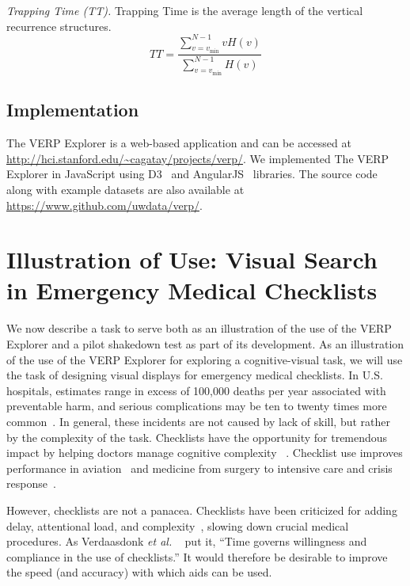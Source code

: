 \documentclass{sigchi}
\newcommand{\etal}{\textit{et al.}\xspace}
\begin{document}
\emph{Trapping Time (TT).} Trapping Time is the average length of the
vertical recurrence structures.
\[
	TT = 
	\frac{
		\sum_{v=v_{\min} }^{N-1}{vH(v)}
 	}{
		\sum_{v=v_{\min} }^{N-1}{ H(v)}
 	}
\]

\subsection{Implementation}  The VERP Explorer is a web-based application
and can be accessed at
\url{http://hci.stanford.edu/~cagatay/projects/verp/}. We implemented The
VERP Explorer in JavaScript using D3~\cite{d3_infovis11} and
AngularJS~\cite{angularweb} libraries.  The source code along with example
datasets are also available at \url{https://www.github.com/uwdata/verp/}. 



\section{Illustration of Use: Visual Search in Emergency Medical Checklists}

We now describe a task to serve both as an illustration of the use of the VERP Explorer and a pilot shakedown test as part of its development. As an illustration of the use of the VERP Explorer for exploring a
cognitive-visual task, we will use the task of designing visual displays
for emergency medical checklists. In U.S. hospitals, estimates range in
excess of 100,000 deaths per year associated with preventable harm, and
serious complications may be ten to twenty times more common~\cite{James_2013}. 
In general, these incidents are not caused by lack of skill, but rather by the
complexity of the task.  Checklists have the opportunity for tremendous
impact by helping doctors manage cognitive complexity ~\cite{Gawande_2009}. 
Checklist use improves performance in aviation~\cite{Boorman_2001,Degani_1990,Burian_2005} 
and medicine from  surgery to intensive care and crisis  
response~\cite{Arriaga_2013,Gawande_2009,Harrison_2006, 
Haynes_2009,Makary_2006,Pronovost_2006,Ziewacz_2011}.

However, checklists are not a panacea. Checklists have been criticized for adding
delay, attentional load, and complexity~\cite{Gawande_2009,Winters_2009}, 
slowing down crucial medical procedures. As Verdaasdonk \etal
~\cite{Verdaasdonk_2008}  put it, “Time governs
willingness and compliance in the use of checklists.” 
It would therefore be desirable to improve the speed (and accuracy) 
with which aids can be used.
\end{document}
